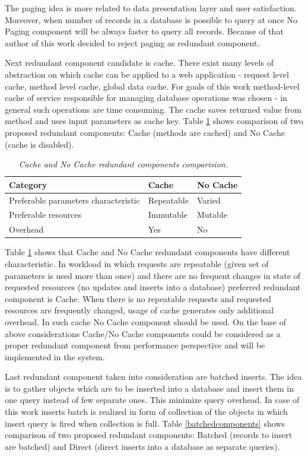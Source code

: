 \documentclass[10pt,a4paper]{article}
\begin{document}
The paging idea is more related to data presentation layer and user satisfaction. Moreover, when number of records in a database is possible to query at once No Paging component will be always faster to query all records. Because of that author of this work decided to reject paging as redundant component. 

Next redundant component candidate is cache. There exist many levels of abstraction on which cache can be applied to a web application - request level cache, method level cache, global data cache. For goals of this work method-level cache of service responsible for managing database operations was chosen - in general such operations are time consuming. The cache saves returned value from method and uses input parameters as cache key. Table \ref{cachecomponents} shows comparison of two proposed redundant components: Cache (methods are cached) and No Cache (cache is disabled).
\begin{table}[!htb]
\def\arraystretch{1.5}
\caption{\textit{Cache and No Cache redundant components comparision.}}\label{cachecomponents}
\begin{tabularx}{\textwidth}{p{3cm}|X|X}
  \textbf{Category} &\textbf{Cache} & \textbf{No Cache} \\
\hline
Preferable parameters characteristic & Repeatable & Varied \\
Preferable resources & Immutable & Mutable\\
Overhead & Yes & No\\
\end{tabularx}
\end{table}
 
Table \ref{cachecomponents} shows that Cache and No Cache redundant components have different characteristic. In workload in which requests are repeatable (given set of parameters is used more than once) and there are no frequent changes in state of requested resources (no updates and inserts into a database) preferred redundant component is Cache. When there is no repeatable requests and requested resources are frequently changed, usage of cache generates only additional overhead. In such cache No Cache component should be used. On the base of above considerations Cache/No Cache components could be considered as a proper redundant component from performance perspective and will be implemented in the system. 

Last redundant component taken into consideration are batched inserts. The idea is to gather objects which are to be inserted into a database and insert them in one query instead of few separate ones. This minimize query overhead. In case of this work inserts batch is realized in form of collection of the objects in which insert query is fired when collection is full.   
Table \ref{batchedcomponents} shows comparison of two proposed redundant components: Batched (records to insert are batched) and Direct (direct inserts into a database as separate queries).
\end{document}
